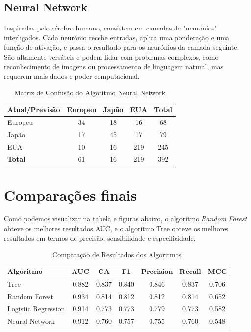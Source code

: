 \documentclass[conference]{IEEEtran}
\begin{document}
\subsection{Neural Network}
Inspiradas pelo cérebro humano, consistem em camadas de "neurónios" interligados. Cada neurónio recebe entradas, 
aplica uma ponderação e uma função de ativação, e passa o resultado para os neurónios da camada seguinte. São altamente versáteis 
e podem lidar com problemas complexos, como reconhecimento de imagens ou processamento de linguagem natural, mas requerem mais dados 
e poder computacional.
\begin{table}[!ht]
    \centering
    \begin{tabular}{lcccc}
    \toprule
    \textbf{Atual/Previsão} & \textbf{Europeu} & \textbf{Japão} & \textbf{EUA} & \textbf{Total} \\
    \midrule
    Europeu & 34 & 18 & 16 & 68 \\
    Japão  & 17 & 45 & 17 & 79 \\
    EUA    & 10 & 16 & 219 & 245 \\
    \midrule
    \textbf{Total} & 61 & 16 & 219 & 392 \\
    \bottomrule
    \end{tabular}
    \label{tab:conf_matrix_neural}
    \caption{Matriz de Confusão do Algoritmo Neural Network}
\end{table}

\section{Comparações finais}
Como podemos visualizar na tabela e figuras abaixo, o algoritmo \textit{Random Forest} obteve os melhores resultados AUC,
e o algoritmo Tree obteve os melhores resultados em termos de precisão, sensibilidade e especificidade.
\begin{table}[!ht]
    \centering
    \begin{tabular}{lcccccc}
    \toprule
    \textbf{Algoritmo} & \textbf{AUC} & \textbf{CA} & \textbf{F1} & \textbf{Precision} & \textbf{Recall} & \textbf{MCC} \\
    \midrule
    Tree                & 0.882 & 0.837 & 0.840 & 0.846 & 0.837 & 0.706 \\
    Random Forest       & 0.934 & 0.814 & 0.812 & 0.812 & 0.814 & 0.652 \\
    Logistic Regression & 0.914 & 0.773 & 0.773 & 0.779 & 0.773 & 0.582 \\
    Neural Network      & 0.912 & 0.760 & 0.757 & 0.755 & 0.760 & 0.548 \\
    \bottomrule
    \end{tabular}
    \label{tab:evaluation_results}
    \caption{Comparação de Resultados dos Algoritmos}
\end{table}
\end{document}
